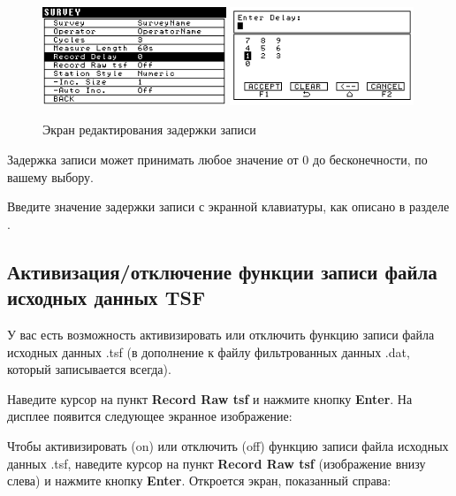 \begin{figure}[H]
  \centering
  \includegraphics[width=0.49\textwidth]{figures/the_record_delay_editing_screen_1}
  \includegraphics[width=0.49\textwidth]{figures/the_record_delay_editing_screen_2}
  \caption{Экран редактирования задержки записи}
  \label{fig:the_record_delay_editing_screen}
\end{figure}

Задержка записи может принимать любое значение от 0 до бесконечности, по
вашему выбору.

Введите значение задержки записи с экранной клавиатуры, как описано в разделе
.

\subsection{Активизация/отключение функции записи файла исходных данных TSF}

У вас есть возможность активизировать или отключить функцию записи файла
исходных данных .tsf (в дополнение к файлу фильтрованных данных .dat, который
записывается всегда).

Наведите курсор на пункт \textbf{Record Raw tsf} и нажмите кнопку
\textbf{Enter}. На дисплее появится следующее экранное изображение:

Чтобы активизировать (on) или отключить (off) функцию записи файла исходных
данных .tsf, наведите курсор на пункт \textbf{Record Raw tsf} (изображение внизу
слева) и нажмите кнопку \textbf{Enter}. Откроется экран, показанный справа:

